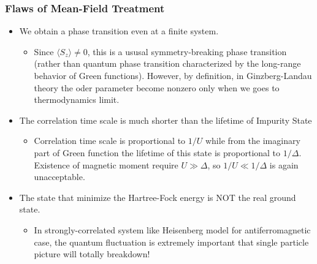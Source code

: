 \documentclass[10pt,aspectratio=43,xcolor=x11names]{beamer}%
\begin{document}
		\begin{frame}[t]\frametitle{Flaws of Mean-Field Treatment}
			\begin{itemize}
				\item {\color{blue}We obtain a phase transition even at a finite system}. 
					\begin{itemize}
					 	\item Since $\langle S_z \rangle\neq0$, this is a ususal symmetry-breaking phase transition (rather than quantum phase transition characterized by the long-range behavior of Green functions). However, by definition, in Ginzberg-Landau theory the oder parameter become nonzero only when we goes to thermodynamics limit.
					 \end{itemize}
				\item {\color{blue}The correlation time scale is much shorter than the lifetime of Impurity State}
					\begin{itemize}
						\item Correlation time scale is proportional to $1/U$ while from the imaginary part of Green function the lifetime of this state is proportional to $1/\Delta$. Existence of magnetic moment require $U\gg\Delta$, so $1/U\ll1/\Delta$ is again unacceptable.
					\end{itemize}
				\item {\color{blue}The state that minimize the Hartree-Fock energy is NOT the real ground state.}
					\begin{itemize}
						\item In strongly-correlated system like Heisenberg model for antiferromagnetic case, the quantum fluctuation is extremely important that single particle picture will totally breakdown!
					\end{itemize}
			\end{itemize}
		\end{frame}
\end{document}
